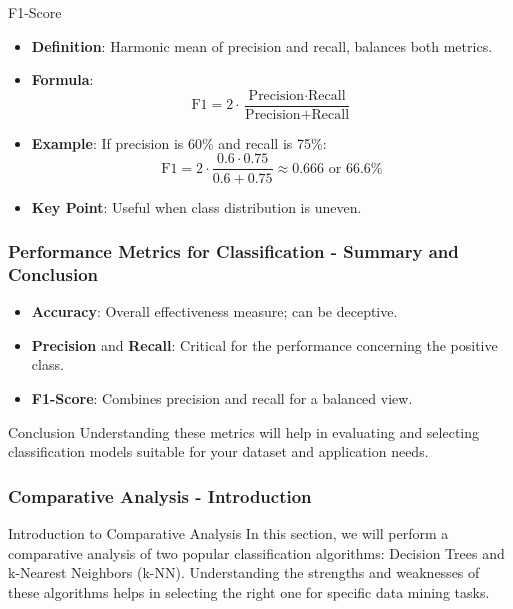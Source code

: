 \documentclass[aspectratio=169]{beamer}
\begin{document}
\begin{frame}[fragile]
    \begin{block}{F1-Score}
        \begin{itemize}
            \item \textbf{Definition}: Harmonic mean of precision and recall, balances both metrics.
            \item \textbf{Formula}:
            \begin{equation}
            \text{F1} = 2 \cdot \frac{\text{Precision} \cdot \text{Recall}}{\text{Precision} + \text{Recall}}
            \end{equation}
            \item \textbf{Example}: If precision is 60\% and recall is 75\%:
            \begin{equation}
            \text{F1} = 2 \cdot \frac{0.6 \cdot 0.75}{0.6 + 0.75} \approx 0.666 \text{ or } 66.6\%
            \end{equation}
            \item \textbf{Key Point}: Useful when class distribution is uneven.
        \end{itemize}
    \end{block}
\end{frame}

\begin{frame}[fragile]
    \frametitle{Performance Metrics for Classification - Summary and Conclusion}
    \begin{itemize}
        \item \textbf{Accuracy}: Overall effectiveness measure; can be deceptive.
        \item \textbf{Precision} and \textbf{Recall}: Critical for the performance concerning the positive class.
        \item \textbf{F1-Score}: Combines precision and recall for a balanced view.
    \end{itemize}
    
    \begin{block}{Conclusion}
        Understanding these metrics will help in evaluating and selecting classification models suitable for your dataset and application needs.
    \end{block}
\end{frame}

\begin{frame}[fragile]
    \frametitle{Comparative Analysis - Introduction}
    \begin{block}{Introduction to Comparative Analysis}
        In this section, we will perform a comparative analysis of two popular classification algorithms: 
        Decision Trees and k-Nearest Neighbors (k-NN). Understanding the strengths and weaknesses 
        of these algorithms helps in selecting the right one for specific data mining tasks.
    \end{block}
\end{frame}
\end{document}
